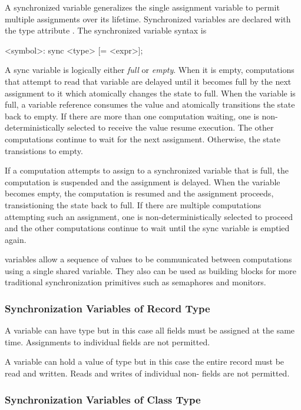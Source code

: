 A synchronized variable generalizes the single assignment variable to
permit multiple assignments over its lifetime. Synchronized variables
are declared with the type attribute . The synchronized
variable syntax is
\begin{chapel}
[var] <symbol>: sync <type> [= <expr>];
\end{chapel}
A sync variable is logically either {\em full} or {\em empty}. When it
is empty, computations that attempt to read that variable are delayed
until it becomes full by the next assignment to it which atomically
changes the state to full. When the variable is full, a variable
reference consumes the value and atomically transitions the state back
to empty. If there are more than one computation waiting, one is
non-deterministically selected to receive the value resume execution.
The other computations continue to wait for the next
assignment. Otherwise, the state transistions to empty. 

If a computation attempts to assign to a synchronized variable that is
full, the computation is suspended and the assignment is delayed. When
the variable becomes empty, the computation is resumed and the
assignment proceeds, transistioning the state back to full. If there
are multiple computations attempting such an assignment, one is
non-deterministically selected to proceed and the other computations
continue to wait until the sync variable is emptied again.

 variables allow a sequence of values to be communicated
between computations using a single shared variable. They also can be
used as building blocks for more traditional synchronization
primitives such as semaphores and monitors.

\subsubsection{Synchronization Variables of Record Type}
\label{Synchronization_Variables_of_Record_Type}

A  variable can have  type but in this case
all fields must be assigned at the same time. Assignments to
individual fields are not permitted.

A  variable can hold a value of  type but in
this case the entire record must be read and written. Reads and writes
of individual non- fields are not permitted.



\subsubsection{Synchronization Variables of Class Type}
\label{Synchronization_Variables_of_Class_Type}

